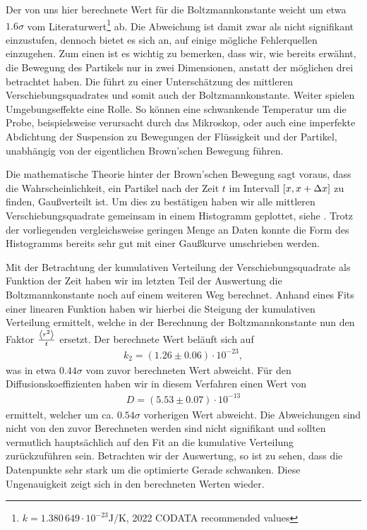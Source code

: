 Der von uns hier berechnete Wert für die Boltzmannkonstante weicht um etwa $1.6\sigma$ vom Literaturwert\footnote{$k = 1.380\,649 \cdot 10^{-23}\si{\joule\per\kelvin}$, 2022 CODATA recommended values} ab. Die Abweichung ist damit zwar als nicht signifikant einzustufen, dennoch bietet es sich an, auf einige mögliche Fehlerquellen einzugehen. Zum einen ist es wichtig zu bemerken, dass wir, wie bereits erwähnt, die Bewegung des Partikels nur in zwei Dimensionen, anstatt der möglichen drei betrachtet haben. Die führt zu einer Unterschätzung des mittleren Verschiebungsquadrates und somit auch der Boltzmannkonstante. Weiter spielen Umgebungseffekte eine Rolle. So können eine schwankende Temperatur um die Probe, beispielsweise verursacht durch das Mikroskop, oder auch eine imperfekte Abdichtung der Suspension zu Bewegungen der Flüssigkeit und der Partikel, unabhängig von der eigentlichen Brown'schen Bewegung führen.

Die mathematische Theorie hinter der Brown'schen Bewegung sagt voraus, dass die Wahrscheinlichkeit, ein Partikel nach der Zeit $t$ im Intervall $\qty[x, x + \Delta x]$ zu finden, Gaußverteilt ist. Um dies zu bestätigen haben wir alle mittleren Verschiebungsquadrate gemeinsam in einem Histogramm geplottet, siehe . Trotz der vorliegenden vergleichsweise geringen Menge an Daten konnte die Form des Histogramms bereits sehr gut mit einer Gaußkurve umschrieben werden.

Mit der Betrachtung der kumulativen Verteilung der Verschiebungsquadrate als Funktion der Zeit haben wir im letzten Teil der Auswertung die Boltzmannkonstante noch auf einem weiteren Weg berechnet. Anhand eines Fits einer linearen Funktion haben wir hierbei die Steigung der kumulativen Verteilung ermittelt, welche in der Berechnung der Boltzmannkonstante nun den Faktor $\frac{\expval{r^2}}{t}$ ersetzt. Der berechnete Wert beläuft sich auf
\begin{align*}
  k_{2} = (1.26 \pm 0.06) \cdot 10^{-23},
\end{align*}
was in etwa $0.44\sigma$ vom zuvor berechneten Wert abweicht. Für den Diffusionskoeffizienten haben wir in diesem Verfahren einen Wert von
\begin{align*}
  D = (5.53 \pm 0.07) \cdot 10^{-13}
\end{align*}
ermittelt, welcher um ca. $0.54\sigma$ vorherigen Wert abweicht. Die Abweichungen sind nicht von den zuvor Berechneten werden sind nicht signifikant und sollten vermutlich hauptsächlich auf den Fit an die kumulative Verteilung zurückzuführen sein. Betrachten wir  der Auswertung, so ist zu sehen, dass die Datenpunkte sehr stark um die optimierte Gerade schwanken. Diese Ungenauigkeit zeigt sich in den berechneten Werten wieder.